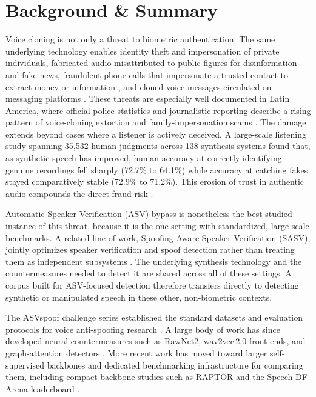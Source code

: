 \documentclass[11pt]{article}
\begin{document}
\section*{Background \& Summary}

Voice cloning is not only a threat to biometric authentication. The same underlying technology enables identity theft and impersonation of private individuals, fabricated audio misattributed to public figures for disinformation and fake news, fraudulent phone calls that impersonate a trusted contact to extract money or information \citep{forbes2019ceofraud,destefano2023testimony,europol2022deepfakes}, and cloned voice messages circulated on messaging platforms \citep{infobae2026whatsapp}. These threats are especially well documented in Latin America, where official police statistics and journalistic reporting describe a rising pattern of voice-cloning extortion and family-impersonation scams \citep{infobae2025colombia,infobae2026whatsapp}. The damage extends beyond cases where a listener is actively deceived. A large-scale listening study spanning 35{,}532 human judgments across 138 synthesis systems found that, as synthetic speech has improved, human accuracy at correctly identifying genuine recordings fell sharply (72.7\% to 64.1\%) while accuracy at catching fakes stayed comparatively stable (72.9\% to 71.2\%). This erosion of trust in authentic audio compounds the direct fraud risk \citep{muller2026erodingtrust}.

Automatic Speaker Verification (ASV) bypass is nonetheless the best-studied instance of this threat, because it is the one setting with standardized, large-scale benchmarks. A related line of work, Spoofing-Aware Speaker Verification (SASV), jointly optimizes speaker verification and spoof detection rather than treating them as independent subsystems \citep{sasvevalplan2022,sasv2022,Wu2026wildspoof}. The underlying synthesis technology and the countermeasures needed to detect it are shared across all of these settings. A corpus built for ASV-focused detection therefore transfers directly to detecting synthetic or manipulated speech in these other, non-biometric contexts.

The ASVspoof challenge series established the standard datasets and evaluation protocols for voice anti-spoofing research \citep{asvspoof2019,asvspoof2021,asvspoof5}. A large body of work has since developed neural countermeasures such as RawNet2, wav2vec\,2.0 front-ends, and graph-attention detectors \citep{rawnet2,tak2022ssl,aasist}. More recent work has moved toward larger self-supervised backbones \citep{vasquez2026wildspoof} and dedicated benchmarking infrastructure for comparing them, including compact-backbone studies such as RAPTOR \citep{raptor2026} and the Speech DF Arena leaderboard \citep{dowerah2025speechdfarena}.
\end{document}
